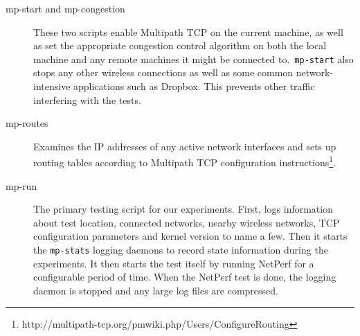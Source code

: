 \begin{description}
  \item[mp-start and mp-congestion]
    These two scripts enable Multipath TCP on the current machine, as well as
    set the appropriate congestion control algorithm on both the local machine
    and any remote machines it might be connected to.\ \texttt{mp-start} also
    stops any other wireless connections as well as some common
    network-intensive applications such as Dropbox. This prevents other traffic
    interfering with the tests.
  \item[mp-routes]
    Examines the IP addresses of any active network interfaces and sets up
    routing tables according to Multipath TCP configuration
    instructions\footnote{http://multipath-tcp.org/pmwiki.php/Users/ConfigureRouting}.
  \item[mp-run]
    The primary testing script for our experiments. First, logs information
    about test location, connected networks, nearby wireless networks, TCP
    configuration parameters and kernel version to name a few. Then it starts
    the \texttt{mp-stats} logging daemons to record state information during the
    experiments. It then starts the test itself by running NetPerf for a
    configurable period of time. When the NetPerf test is done, the logging
    daemon is stopped and any large log files are compressed.


\end{description}
